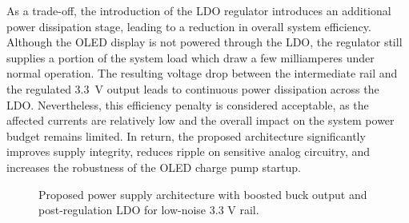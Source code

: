 As a trade-off, the introduction of the LDO regulator introduces an additional power dissipation stage, leading to a reduction in overall system efficiency. Although the OLED display is not powered through the LDO, the regulator still supplies a portion of the system load which draw a few milliamperes under normal operation. The resulting voltage drop between the intermediate rail and the regulated \SI{3.3}{\volt} output leads to continuous power dissipation across the LDO. Nevertheless, this efficiency penalty is considered acceptable, as the affected currents are relatively low and the overall impact on the system power budget remains limited. In return, the proposed architecture significantly improves supply integrity, reduces ripple on sensitive analog circuitry, and increases the robustness of the OLED charge pump startup.

\begin{figure}[H]
\centering
{}
\caption{Proposed power supply architecture with boosted buck output and post-regulation LDO for low-noise 3.3 V rail.}
\label{fig:power_supply_tree}
\end{figure}